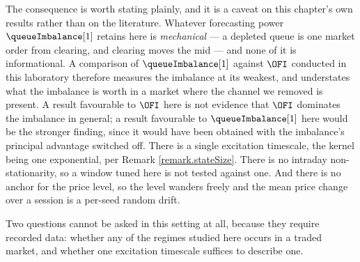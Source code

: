 The consequence is worth stating plainly, and it is a caveat on this chapter's own results
rather than on the literature.
Whatever forecasting power $\queueImbalance[1]$ retains here is \emph{mechanical} ---
a depleted queue is one market order from clearing, and clearing moves the mid ---
and none of it is informational.
A comparison of $\queueImbalance[1]$ against $\OFI$ conducted in this laboratory
therefore measures the imbalance at its weakest,
and understates what the imbalance is worth in a market where the channel we removed is
present.
A result favourable to $\OFI$ here is not evidence that $\OFI$ dominates the imbalance in
general; a result favourable to $\queueImbalance[1]$ here would be the stronger finding,
since it would have been obtained with the imbalance's principal advantage switched off.
There is a single excitation timescale, the kernel being one exponential,
per Remark \ref{remark.stateSize}.
There is no intraday non-stationarity, so a window tuned here is not tested against one.
And there is no anchor for the price level, so the level wanders freely
and the mean price change over a session is a per-seed random drift.

Two questions cannot be asked in this setting at all,
because they require recorded data:
whether any of the regimes studied here occurs in a traded market,
and whether one excitation timescale suffices to describe one.
